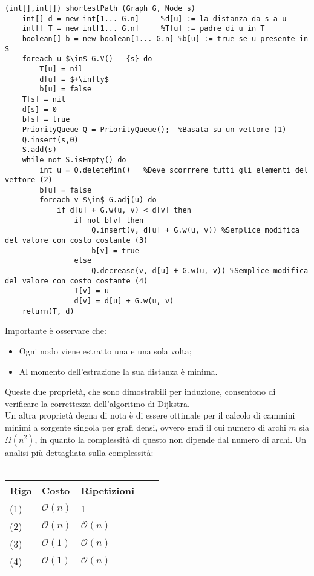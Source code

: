 \documentclass[../cheatSheetAlgoritmi.tex]{subfiles}
\begin{document}
\begin{lstlisting}[caption=Algoritmo di Edsger W. Dijkstra: cammini minimi a sorgente singola]
(int[],int[]) shortestPath (Graph G, Node s)
	int[] d = new int[1... G.n]		%d[u] := la distanza da s a u 
	int[] T = new int[1... G.n]		%T[u] := padre di u in T
	boolean[] b = new boolean[1... G.n]	%b[u] := true se u presente in S 
	foreach u $\in$ G.V() - {s} do
		T[u] = nil
		d[u] = $+\infty$
		b[u] = false
	T[s] = nil
	d[s] = 0
	b[s] = true
	PriorityQueue Q = PriorityQueue();	%Basata su un vettore (1)
	Q.insert(s,0)
	S.add(s)
	while not S.isEmpty() do 
		int u = Q.deleteMin()	%Deve scorrrere tutti gli elementi del vettore (2)
		b[u] = false
		foreach v $\in$ G.adj(u) do
			if d[u] + G.w(u, v) < d[v] then 
				if not b[v] then
					Q.insert(v, d[u] + G.w(u, v)) %Semplice modifica del valore con costo costante (3)
					b[v] = true
				else
					Q.decrease(v, d[u] + G.w(u, v)) %Semplice modifica del valore con costo costante (4)
				T[v] = u 
				d[v] = d[u] + G.w(u, v)
	return(T, d)
\end{lstlisting}
Importante è osservare che:
\begin{itemize}
	\item Ogni nodo viene estratto una e una sola volta;
	\item Al momento dell’estrazione la sua distanza è minima.
\end{itemize}
Queste due proprietà, che sono dimostrabili per induzione, consentono di verificare la correttezza dell'algoritmo di Dijkstra. \\
Un altra proprietà degna di nota è di essere ottimale per il calcolo di cammini minimi a sorgente singola per grafi densi, ovvero grafi il cui numero di archi $m$ sia $\Omega(n^2)$, in quanto la complessità di questo non dipende dal numero di archi.
Un analisi più dettagliata sulla complessità:
\\\\
\begin{tabular}{@{}lllll@{}}
\toprule
Riga & Costo & Ripetizioni &  &  \\ \midrule
(1) & $\mathcal{O}(n)$     & 1           &  &  \\
(2)    & $\mathcal{O}(n)$     & $\mathcal{O}(n)$           &  &  \\
(3)    & $\mathcal{O}(1)$     & $\mathcal{O}(n)$           &  &  \\
(4)    & $\mathcal{O}(1)$     & $\mathcal{O}(n)$           &  &  \\ \bottomrule
\end{tabular}
\end{document}
